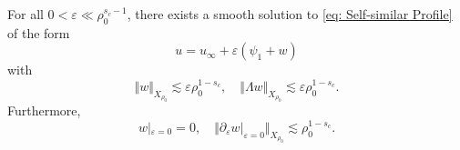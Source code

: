 \begin{proposition}
\label{prop: Exterior Solutions}
For all $0<\varepsilon\ll\rho_0^{s_c-1}$, there exists a smooth solution to \eqref{eq: Self-similar Profile} of the form
\[
u=u_\infty+\varepsilon(\psi_1+w)
\]
with
\begin{equation}
\label{eq: Bounds on w}
\Vert w\Vert _{X_{\rho_0}}\lesssim\varepsilon \rho_0^{1-s_c},\quad \Vert \Lambda w\Vert _{X_{\rho_0}}\lesssim \varepsilon \rho_0^{1-s_c}.
\end{equation}
Furthermore,
\[
w|_{\varepsilon=0}=0,\quad \Vert \partial_\varepsilon w|_{\varepsilon=0}\Vert _{X_{\rho_0}}\lesssim \rho_0^{1-s_c}.
\]
\end{proposition}
